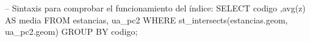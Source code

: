 \lstset{caption=Comprobar velocidad del índice GiST,label=sql:qIndex}
\begin{SQL}
-- Sintaxis para comprobar el funcionamiento del índice:
SELECT codigo ,avg(z) AS media FROM estancias, ua_pc2
WHERE st_intersects(estancias.geom, ua_pc2.geom) 
GROUP BY codigo;
\end{SQL}
